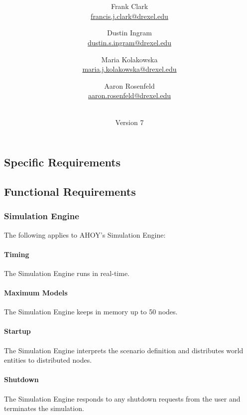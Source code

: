 \documentclass[titlepage]{article}
\title{\textbf{\mytitle}}
\author{
	Frank Clark \\\url{francis.j.clark@drexel.edu}
    \and Dustin Ingram \\\url{dustin.s.ingram@drexel.edu}
	\and Maria Kolakowska \\\url{maria.j.kolakowska@drexel.edu}
    \and Aaron Rosenfeld \\\url{aaron.rosenfeld@drexel.edu}
}
\date{\mydate\\Version 7}
\newcommand{\cbox}[0]{
    \CheckBox[height=5pt,width=5pt]{}
}
\begin{document}

\begin{figure}
    \centering
    \scalebox{0.8}{}
    \vspace{-4em}
\end{figure}

\maketitle

\setcounter{tocdepth}{4}
\pagebreak
\pagebreak
{}


\begin{Form}

\section{Specific Requirements%
  \label{specific-requirements}%
}

\subsection{Functional Requirements%
    \label{functional}%
}

\subsubsection{Simulation Engine}
	The following applies to AHOY's Simulation Engine:
    \paragraph{Timing} The Simulation Engine runs in real-time.\cbox
    \paragraph{Maximum Models} The Simulation Engine keeps in memory up to 50 nodes.\cbox
    \paragraph{Startup} The Simulation Engine interprets the scenario definition and distributes world entities to distributed nodes.\cbox
    \paragraph{Shutdown} The Simulation Engine responds to any shutdown requests from the user and terminates the simulation.\cbox


\end{Form}
\end{document}
